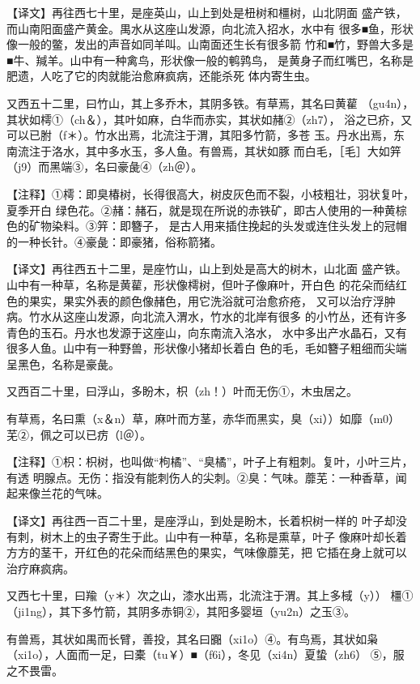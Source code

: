 \documentclass[a4paper,12pt,UTF8,twoside]{ctexbook}
\begin{document}
【译文】再往西七十里，是座英山，山上到处是杻树和橿树，山北阴面 盛产铁，而山南阳面盛产黄金。禺水从这座山发源，向北流入招水，水中有 很多■鱼，形状像一般的鳖，发出的声音如同羊叫。山南面还生长有很多箭 竹和■竹，野兽大多是■牛、羬羊。山中有一种禽鸟，形状像一般的鹌鹑鸟， 是黄身子而红嘴巴，名称是肥遗，人吃了它的肉就能治愈麻疯病，还能杀死 体内寄生虫。

又西五十二里，曰竹山，其上多乔木，其阴多铁。有草焉，其名曰黄雚 （gu4n），其状如樗①（ch＆），其叶如麻，白华而赤实，其状如赭②（zh7）， 浴之已疥，又可以已胕（f＊）。竹水出焉，北流注于渭，其阳多竹箭，多苍 玉。丹水出焉，东南流注于洛水，其中多水玉，多人鱼。有兽焉，其状如豚 而白毛，［毛］大如笄（j9）而黑端③，名曰豪彘④（zh＠）。

【注释】①樗：即臭椿树，长得很高大，树皮灰色而不裂，小枝粗壮，羽状复叶，夏季开白 绿色花。②赭：赭石，就是现在所说的赤铁矿，即古人使用的一种黄棕色的矿物染料。③笄：即簪子， 是古人用来插住挽起的头发或连住头发上的冠帽的一种长针。④豪彘：即豪猪，俗称箭猪。

【译文】再往西五十二里，是座竹山，山上到处是高大的树木，山北面 盛产铁。山中有一种草，名称是黄雚，形状像樗树，但叶子像麻叶，开白色 的花朵而结红色的果实，果实外表的颜色像赭色，用它洗浴就可治愈疥疮， 又可以治疗浮肿病。竹水从这座山发源，向北流入渭水，竹水的北岸有很多 的小竹丛，还有许多青色的玉石。丹水也发源于这座山，向东南流入洛水， 水中多出产水晶石，又有很多人鱼。山中有一种野兽，形状像小猪却长着白 色的毛，毛如簪子粗细而尖端呈黑色，名称是豪彘。

又西百二十里，曰浮山，多盼木，枳（zh！）叶而无伤①，木虫居之。

有草焉，名曰熏（x＆n）草，麻叶而方茎，赤华而黑实，臭（xi））如靡（m0） 芜②，佩之可以已疠（l＠）。

【注释】①枳：枳树，也叫做“枸橘”、“臭橘”，叶子上有粗刺。复叶，小叶三片，有透 明腺点。无伤：指没有能刺伤人的尖刺。②臭：气味。蘼芜：一种香草，闻起来像兰花的气味。

【译文】再往西一百二十里，是座浮山，到处是盼木，长着枳树一样的 叶子却没有刺，树木上的虫子寄生于此。山中有一种草，名称是熏草，叶子 像麻叶却长着方方的茎干，开红色的花朵而结黑色的果实，气味像蘼芜，把 它插在身上就可以治疗麻疯病。

又西七十里，曰羭（y＊）次之山，漆水出焉，北流注于渭。其上多棫（y）） 橿①（ji1ng），其下多竹箭，其阴多赤铜②，其阳多婴垣（yu2n）之玉③。

有兽焉，其状如禺而长臂，善投，其名曰嚻（xi1o）④。有鸟焉，其状如枭 （xi1o），人面而一足，曰橐（tu￥）■（f6i），冬见（xi4n）夏蛰（zh6） ⑤，服之不畏雷。
\end{document}
